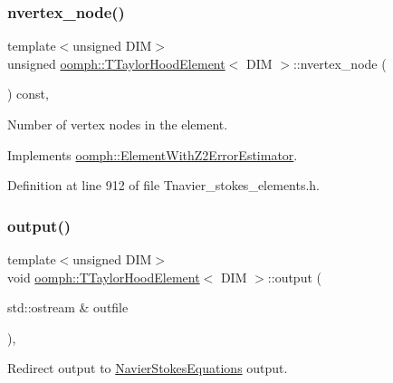 \subsubsection{\texorpdfstring{nvertex\+\_\+node()}{nvertex\_node()}}
{\footnotesize\ttfamily template$<$unsigned D\+IM$>$ \\
unsigned \hyperlink{classoomph_1_1TTaylorHoodElement}{oomph\+::\+T\+Taylor\+Hood\+Element}$<$ D\+IM $>$\+::nvertex\+\_\+node (\begin{DoxyParamCaption}{ }\end{DoxyParamCaption}) const\hspace{0.3cm}{\ttfamily [inline]}, {\ttfamily [virtual]}}



Number of vertex nodes in the element. 



Implements \hyperlink{classoomph_1_1ElementWithZ2ErrorEstimator_a19495a0e77ef4ff35f15fdf7913b4077}{oomph\+::\+Element\+With\+Z2\+Error\+Estimator}.



Definition at line 912 of file Tnavier\+\_\+stokes\+\_\+elements.\+h.

\mbox{\label{classoomph_1_1TTaylorHoodElement_ac811dc5fb7c1dcad508cf2e4759bef32}} 
\subsubsection{\texorpdfstring{output()}{output()}\hspace{0.1cm}{\footnotesize\ttfamily [1/4]}}
{\footnotesize\ttfamily template$<$unsigned D\+IM$>$ \\
void \hyperlink{classoomph_1_1TTaylorHoodElement}{oomph\+::\+T\+Taylor\+Hood\+Element}$<$ D\+IM $>$\+::output (\begin{DoxyParamCaption}\item[{std\+::ostream \&}]{outfile }\end{DoxyParamCaption})\hspace{0.3cm}{\ttfamily [inline]}, {\ttfamily [virtual]}}



Redirect output to \hyperlink{classoomph_1_1NavierStokesEquations}{Navier\+Stokes\+Equations} output. 



